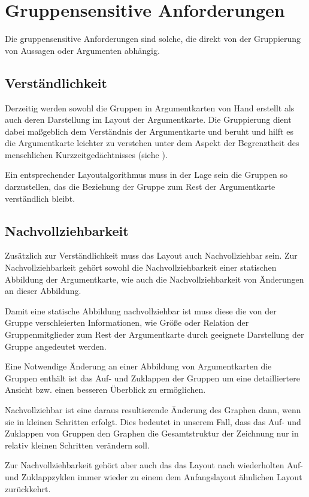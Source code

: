 \section{Gruppensensitive Anforderungen}
Die gruppensensitive Anforderungen sind solche, die direkt von der Gruppierung von Aussagen oder Argumenten abhängig.

\subsection{Verständlichkeit}
Derzeitig werden sowohl die Gruppen in Argumentkarten von Hand erstellt als auch deren Darstellung im Layout der Argumentkarte. Die Gruppierung dient dabei maßgeblich dem Verständnis der Argumentkarte und beruht und hilft es die Argumentkarte leichter zu verstehen unter dem Aspekt der Begrenztheit des menschlichen Kurzzeitgedächtnisses (siehe \cite{miller1956magical, BBS:84441}).

Ein entsprechender Layoutalgorithmus muss in der Lage sein die Gruppen so darzustellen, das die Beziehung der Gruppe zum Rest der Argumentkarte verständlich bleibt.

\subsection{Nachvollziehbarkeit}
Zusätzlich zur Verständlichkeit muss das Layout auch Nachvollziehbar sein. Zur Nachvollziehbarkeit gehört sowohl die Nachvollziehbarkeit einer statischen Abbildung der Argumentkarte, wie auch die Nachvollziehbarkeit von Änderungen an dieser Abbildung.

Damit eine statische Abbildung nachvollziehbar ist muss diese die von der Gruppe verschleierten Informationen, wie Größe oder Relation der Gruppenmitglieder zum Rest der Argumentkarte durch geeignete Darstellung der Gruppe angedeutet werden.

Eine Notwendige Änderung an einer Abbildung von Argumentkarten die Gruppen enthält ist das Auf- und Zuklappen der Gruppen um eine detailliertere Ansicht bzw. einen besseren Überblick zu ermöglichen.

Nachvollziehbar ist eine daraus resultierende Änderung des Graphen dann, wenn sie in kleinen Schritten erfolgt. Dies bedeutet in unserem Fall, dass das Auf- und Zuklappen von Gruppen den Graphen die Gesamtstruktur der Zeichnung nur in relativ kleinen Schritten verändern soll.

Zur Nachvollziehbarkeit gehört aber auch das das Layout nach wiederholten Auf- und Zuklappzyklen immer wieder zu einem dem Anfangslayout ähnlichen Layout zurückkehrt.


